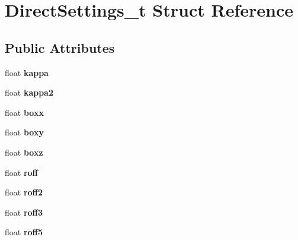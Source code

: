 \hypertarget{structDirectSettings__t}{}\section{Direct\+Settings\+\_\+t Struct Reference}
\label{structDirectSettings__t}
\subsection*{Public Attributes}
\begin{DoxyCompactItemize}
\item 
\hypertarget{structDirectSettings__t_ac690685545efdb10cc05c250c0634f7d}{}\label{structDirectSettings__t_ac690685545efdb10cc05c250c0634f7d} 
float {\bfseries kappa}
\item 
\hypertarget{structDirectSettings__t_a53ede6acd150841083aae5431a17150d}{}\label{structDirectSettings__t_a53ede6acd150841083aae5431a17150d} 
float {\bfseries kappa2}
\item 
\hypertarget{structDirectSettings__t_af22ab6924d4b2003884472f86b6f19b3}{}\label{structDirectSettings__t_af22ab6924d4b2003884472f86b6f19b3} 
float {\bfseries boxx}
\item 
\hypertarget{structDirectSettings__t_ac0e376e1741f1392e1b695d49cad1097}{}\label{structDirectSettings__t_ac0e376e1741f1392e1b695d49cad1097} 
float {\bfseries boxy}
\item 
\hypertarget{structDirectSettings__t_aa9fdea5c9d8edad28a7c1ae4aa1be8ea}{}\label{structDirectSettings__t_aa9fdea5c9d8edad28a7c1ae4aa1be8ea} 
float {\bfseries boxz}
\item 
\hypertarget{structDirectSettings__t_a29d92555be1811d5a97e62cb7a8bff90}{}\label{structDirectSettings__t_a29d92555be1811d5a97e62cb7a8bff90} 
float {\bfseries roff}
\item 
\hypertarget{structDirectSettings__t_af1e37b6f6e3209d69b9676fe7bb462db}{}\label{structDirectSettings__t_af1e37b6f6e3209d69b9676fe7bb462db} 
float {\bfseries roff2}
\item 
\hypertarget{structDirectSettings__t_ac47ba95d86b530f3a510f747ab1ed52c}{}\label{structDirectSettings__t_ac47ba95d86b530f3a510f747ab1ed52c} 
float {\bfseries roff3}
\item 
\hypertarget{structDirectSettings__t_a3e7f86660f9d2dcdcc7c503bea91d454}{}\label{structDirectSettings__t_a3e7f86660f9d2dcdcc7c503bea91d454} 
float {\bfseries roff5}
\item 
\hypertarget{structDirectSettings__t_a6f307552ea44aff0a21599e6ffe5ebbe}{}\label{structDirectSettings__t_a6f307552ea44aff0a21599e6ffe5ebbe} 

\end{DoxyCompactItemize}

